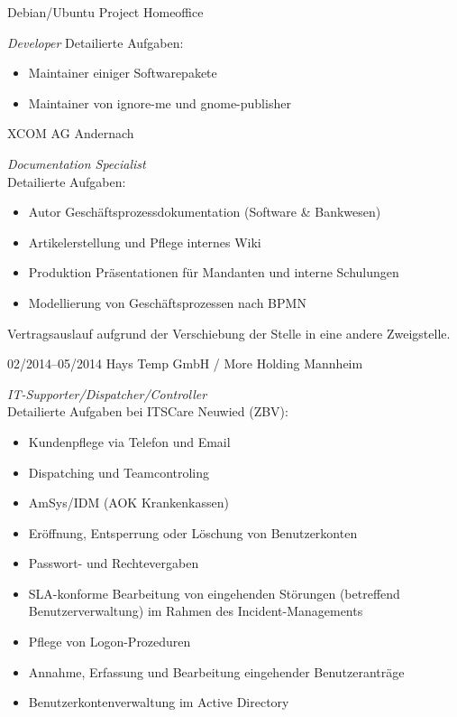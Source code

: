 \documentclass[a4paper]{friggeri-cv} %
\begin{document}
\begin{entrylist}
{Debian/Ubuntu Project}
{Homeoffice}
{\emph{Developer}
	Detailierte Aufgaben:
	\begin{itemize}
		\item Maintainer einiger Softwarepakete
		\item Maintainer von ignore-me und gnome-publisher		
	\end{itemize}
}
{XCOM AG}
{Andernach}
{\emph{Documentation Specialist} \\
	Detailierte Aufgaben:
	\begin{itemize}
		\item Autor Geschäftsprozessdokumentation (Software \& Bankwesen)
		\item Artikelerstellung und Pflege internes Wiki
		\item Produktion Präsentationen für Mandanten und interne Schulungen
		\item Modellierung von Geschäftsprozessen nach BPMN
	\end{itemize}
	Vertragsauslauf aufgrund der Verschiebung der Stelle in eine andere Zweigstelle.
}
\entry
{02/2014--05/2014}
{Hays Temp GmbH / More Holding}
{Mannheim}
{\emph{IT-Supporter/Dispatcher/Controller} \\
    Detailierte Aufgaben bei ITSCare Neuwied (ZBV):
    \begin{itemize}
        \item Kundenpflege via Telefon und Email
        \item Dispatching und Teamcontroling
        \item AmSys/IDM (AOK Krankenkassen)
        \item Eröffnung, Entsperrung oder Löschung von Benutzerkonten
        \item Passwort- und Rechtevergaben
        \item SLA-konforme Bearbeitung von eingehenden Störungen (betreffend Benutzerverwaltung) im Rahmen des Incident-Managements
        \item Pflege von Logon-Prozeduren
        \item Annahme, Erfassung und Bearbeitung eingehender Benutzeranträge
        \item Benutzerkontenverwaltung im Active Directory
    \end{itemize}
}

\end{entrylist}
\end{document}
